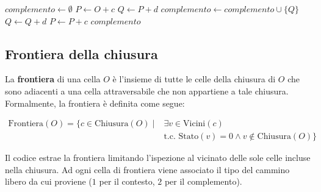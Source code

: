 \begin{algorithm}[H]
\caption{Calcolo del complemento (celle raggiungibili solo con cammini liberi di tipo 2)}
\label{alg:calcola_complemento}
\begin{algorithmic}[1]
    \State $complemento \leftarrow \emptyset$
            \State $P \leftarrow O + c$
                \State {}
                \State $Q \leftarrow P + d$
                        \State $complemento \leftarrow complemento \cup \{Q\}$
                    \EndIf
                    \State $Q \leftarrow Q + d$
                \EndWhile
                \State $P \leftarrow P + c$
            \EndWhile
        \EndFor
    \EndFor
    \State \Return $complemento$
\EndProcedure
\end{algorithmic}
\end{algorithm}

\subsection{Frontiera della chiusura}

La \textbf{frontiera} di una cella $O$ è l'insieme di tutte le celle della chiusura di $O$ che sono adiacenti a una cella attraversabile che non appartiene a tale chiusura. Formalmente, la frontiera è definita come segue:

\begin{equation}
\begin{aligned}
\text{Frontiera}(O) = \{ c \in \text{Chiusura}(O) \mid {} & \exists v \in \text{Vicini}(c) \\
& \text{t.c. } \text{Stato}(v) = 0 \land v \notin \text{Chiusura}(O) \}
\end{aligned}
\label{eq:frontiera}
\end{equation}

Il codice estrae la frontiera limitando l'ispezione al vicinato delle sole celle incluse nella chiusura. Ad ogni cella di frontiera viene associato il tipo del cammino libero da cui proviene ($1$ per il contesto, $2$ per il complemento).

